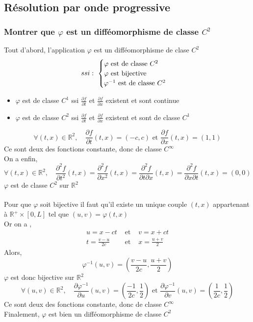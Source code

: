 \documentclass[12pt]{article}
\begin{document}
\subsection{Résolution par onde progressive}
\subsubsection{Montrer que $\varphi$ est un difféomorphisme de classe $C^2$}
\noindent Tout d'abord, l'application $\varphi$ est un difféomorphisme de clase $C^2$
\[
ssi : \
\begin{cases}
\varphi$ est de classe $C^2 \\
\varphi$ est bijective $ \\
\varphi^{-1}$ est de classe $C^2 \\
\end{cases}
\]
\begin{itemize}
\item $\varphi$ est de classe $C^1$ ssi $\frac{\partial f}{\partial t}$ et $\frac{\partial f}{\partial x}$ existent et sont continue
\item $\varphi$ est de classe $C^2$ ssi $\frac{\partial f}{\partial t}$ et $\frac{\partial f}{\partial x}$ existent et sont de classe $C^1$ \\
\end{itemize}
\[
\forall (t,x)\in \mathbb{R}^2,\quad \frac{\partial f}{\partial t}(t,x)=(-c,c) \text{ et } \frac{\partial f}{\partial x}(t,x)=(1,1)
\]
Ce sont deux des fonctions constante, donc de classe $C^{\infty}$ \\
On a enfin, \\
\[
\forall (t,x)\in \mathbb{R}^2,\quad \frac{\partial^2 f}{\partial t^2}(t,x)=\frac{\partial^2 f}{\partial x^2}(t,x)=\frac{\partial^2 f}{\partial t \partial x}(t,x)=\frac{\partial^2 f}{\partial x \partial t}(t,x)=(0,0)
\]
$\varphi$ est de classe $C^2$ sur $\mathbb{R}^2$ \\ \\
Pour que $\varphi$ soit bijective il faut qu'il existe un unique couple $(t,x)$ appartenant à $\mathbb{R}^+ \times [0,L]$ tel que $(u,v)=\varphi (t,x)$ \\
Or on a ,
\[
\begin{matrix}
u=x-ct & \text{ et } & v=x+ct \\
t=\frac{v-u}{2c} & \text{ et } & x= \frac{u+v}{2}
\end{matrix}
\]
Alors,
\begin{equation}
\varphi^{-1}(u,v)=(\frac{v-u}{2c},\frac{u+v}{2})
\end{equation}
$\varphi$ est donc bijective sur $\mathbb{R}^2$
\[
\forall (u,v)\in \mathbb{R}^2,\quad \frac{\partial \varphi^{-1}}{\partial u}(u,v)=(\frac{-1}{2c},\frac{1}{2}) \text{ et } \frac{\partial \varphi^{-1}}{\partial v}(u,v)=(\frac{1}{2c},\frac{1}{2})
\]
Ce sont deux des fonctions constante, donc de classe $C^{\infty}$ \\
Finalement, $\varphi$ est bien un difféomorphisme de classe $C^2$
\end{document}

